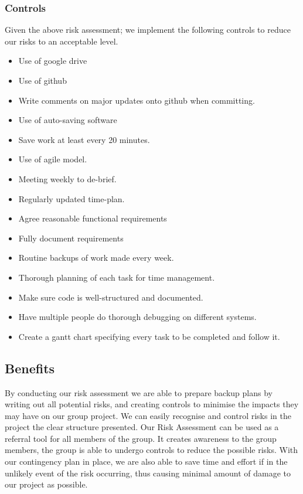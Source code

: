 			\subsubsection*{Controls}
            
            Given the above risk assessment; we implement the following controls to reduce our risks to an acceptable level.
				\begin{itemize}
					\item Use of google drive
					\item Use of github
					\item Write comments on major updates onto github when committing.
					\item Use of auto-saving software
					\item Save work at least every 20 minutes.
					\item Use of agile model.
					\item Meeting weekly to de-brief.
					\item Regularly updated time-plan.
					\item Agree reasonable functional requirements
					\item Fully document requirements
					\item Routine backups of work made every week.
					\item Thorough planning of each task for time management.
					\item Make sure code is well-structured and documented.
					\item Have multiple people do thorough debugging on different systems.
					\item Create a gantt chart specifying every task to be completed and follow it. 
				\end{itemize}
		
		\subsection*{Benefits}

			By conducting our risk assessment we are able to prepare backup plans by writing out all potential risks, and creating controls to minimise the impacts they may have on our group project. We can easily recognise and control risks in the project the clear structure presented. Our Risk Assessment can be used as a referral tool for all members of the group. It creates awareness to the group members, the group is able to undergo controls to reduce the possible risks. With our contingency plan in place, we are also able to save time and effort if in the unlikely event of the risk occurring, thus causing minimal amount of damage to our project as possible. 

